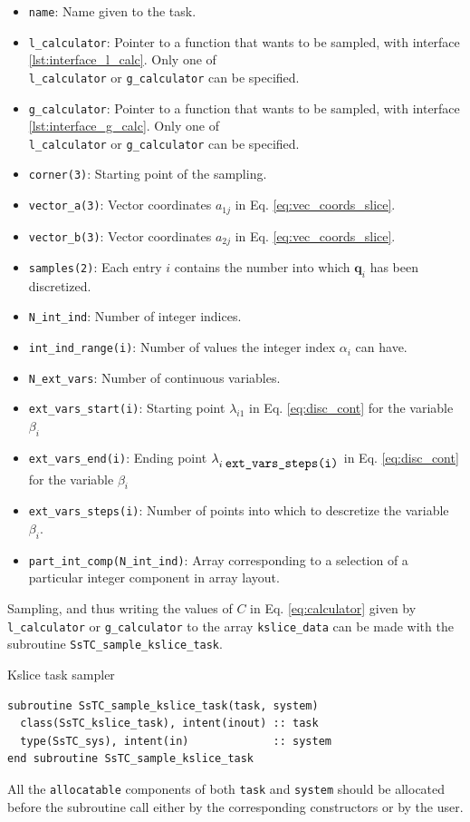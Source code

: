 \documentclass[10pt,a4paper]{article}
\begin{document}
\begin{tcolorbox}
\begin{itemize}
\item \verb|name|: Name given to the task.
\item \verb|l_calculator|: Pointer to a function that wants to be sampled, with interface \ref{lst:interface_l_calc}. Only one of \\ \verb|l_calculator| or \verb|g_calculator| can be specified.
\item \verb|g_calculator|: Pointer to a function that wants to be sampled, with interface \ref{lst:interface_g_calc}. Only one of \\ \verb|l_calculator| or \verb|g_calculator| can be specified.
\item \verb|corner(3)|: Starting point of the sampling.
\item \verb|vector_a(3)|: Vector coordinates $a_{1j}$ in Eq. \eqref{eq:vec_coords_slice}.
\item \verb|vector_b(3)|: Vector coordinates $a_{2j}$ in Eq. \eqref{eq:vec_coords_slice}.
\item \verb|samples(2)|: Each entry $i$ contains the number into which $\bm{q}_i$ has been discretized.
\item \verb|N_int_ind|: Number of integer indices.
\item \verb|int_ind_range(i)|: Number of values the integer index $\alpha_i$ can have.
\item \verb|N_ext_vars|: Number of continuous variables.
\item \verb|ext_vars_start(i)|: Starting point $\lambda_{i1}$ in Eq. \eqref{eq:disc_cont} for the variable $\beta_i$
\item \verb|ext_vars_end(i)|: Ending point $\lambda_{i\;\verb|ext_vars_steps(i)|}$ in Eq. \eqref{eq:disc_cont} for the variable $\beta_i$
\item \verb|ext_vars_steps(i)|: Number of points into which to descretize the variable $\beta_i$.
\item \verb|part_int_comp(N_int_ind)|: Array corresponding to a selection of a particular integer component in array layout.
\end{itemize}
\end{tcolorbox}
Sampling, and thus writing the values of $C$ in Eq. \eqref{eq:calculator} given by \verb|l_calculator| or \verb|g_calculator| to the array \verb|kslice_data| can be made with the subroutine \verb|SsTC_sample_kslice_task|.
\begin{codebox}{Kslice task sampler}
\begin{lstlisting}[caption={Interface of the ``kslice" sampler.},captionpos=b]
subroutine SsTC_sample_kslice_task(task, system)
  class(SsTC_kslice_task), intent(inout) :: task
  type(SsTC_sys), intent(in)             :: system
end subroutine SsTC_sample_kslice_task
\end{lstlisting}
\end{codebox}
All the \verb|allocatable| components of both \verb|task| and \verb|system| should be allocated before the subroutine call either by the corresponding constructors or by the user.
\end{document}
